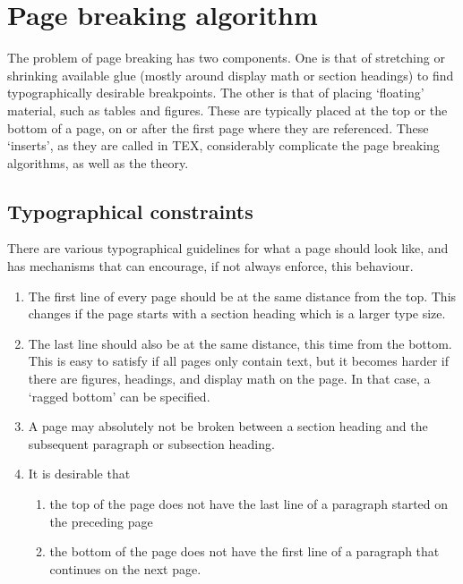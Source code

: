 \section{Page breaking algorithm}

The problem of page breaking has two components. One is that of stretching or shrinking
available glue (mostly around display math or section headings) to find typographically
desirable breakpoints. The other is that of placing ‘floating’ material, such as tables and
figures. These are typically placed at the top or the bottom of a page, on or after the first
page where they are referenced. These ‘inserts’, as they are called in TEX, considerably
complicate the page breaking algorithms, as well as the theory.

\subsection{Typographical constraints}

There are various typographical guidelines for what a page should look like, and \tex has
mechanisms that can encourage, if not always enforce, this behaviour.

\begin{enumerate}
\item The first line of every page should be at the same distance from the top. This changes
if the page starts with a section heading which is a larger type size.

\item The last line should also be at the same distance, this time from the bottom. This
is easy to satisfy if all pages only contain text, but it becomes harder if there are
figures, headings, and display math on the page. In that case, a ‘ragged bottom’ can
be specified.

\item  A page may absolutely not be broken between a section heading and the subsequent
paragraph or subsection heading.

\item It is desirable that

\begin{enumerate}
\item the top of the page does not have the last line of a paragraph started on the
preceding page

\item the bottom of the page does not have the first line of a paragraph that continues
on the next page.
\end{enumerate}

\end{enumerate}



